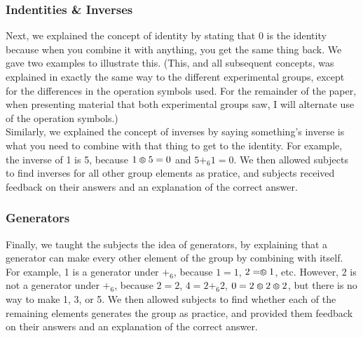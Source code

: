 \documentclass[11pt]{article}
\def\hex{\mathrel{%
    \mathchoice{\HEX}{\HEX}{\scriptsize\HEX}{\tiny\HEX}%
}}
\def\HEX{{%
    \setbox0\hbox{\varhexagon}%
    \rlap{\hbox to \wd0{\hss\raisebox{1 pt}{\scaleobj{0.6}{6}}\hss}}\box0
}}
\begin{document}
\subsubsection{Indentities \& Inverses}
Next, we explained the concept of identity by stating that 0 is the identity because when you combine it with anything, you get the same thing back. We gave two examples to illustrate this. (This, and all subsequent concepts, was explained in exactly the same way to the different experimental groups, except for the differences in the operation symbols used. For the remainder of the paper, when presenting material that both experimental groups saw, I will alternate use of the operation symbols.)\\[11pt]
Similarly, we explained the concept of inverses by saying something's inverse is what you need to combine with that thing to get to the identity. For example, the inverse of 1 is 5, because $1 \hex 5 = 0$ and $5 +_6 1 = 0$. We then allowed subjects to find inverses for all other group elements as pratice, and subjects received feedback on their answers and an explanation of the correct answer.
\subsubsection{Generators}
Finally, we taught the subjects the idea of generators, by explaining that a generator can make every other element of the group by combining with itself. For example, 1 is a generator under $+_6$, because $1 = 1$, $2 = \hex 1$, etc. However, 2 is not a generator under $+_6$, because $2 = 2$, $4 = 2 +_6 2$, $0 = 2\hex 2 \hex 2$, but there is no way to make 1, 3, or 5. We then allowed subjects to find whether each of the remaining elements generates the group as practice, and provided them feedback on their answers and an explanation of the correct answer.
\end{document}
